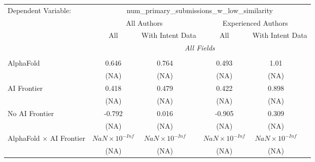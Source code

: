 \begingroup
\centering
\begin{tabular}{lcccccc}
   \tabularnewline \midrule \midrule
   Dependent Variable: & \multicolumn{6}{c}{num\_primary\_submissions\_w\_low\_similarity}\\
 & \multicolumn{3}{c}{All Authors} & \multicolumn{3}{c}{Experienced Authors} \\
\cmidrule(lr){2-4} \cmidrule(lr){5-7}
 & \multicolumn{1}{c}{All} & \multicolumn{2}{c}{With Intent Data} & \multicolumn{1}{c}{All} & \multicolumn{2}{c}{With Intent Data} \\
\cmidrule(lr){2-2} \cmidrule(lr){3-4} \cmidrule(lr){5-5} \cmidrule(lr){6-7}
 & \multicolumn{6}{c}{\textit{All Fields}} \\ \\
   AlphaFold                                                                  & 0.646                  & 0.764                  &                        & 0.493                  & 1.01                   &   \\   
                                                                              & (NA)                   & (NA)                   &                        & (NA)                   & (NA)                   &   \\   
   AI Frontier                                                                & 0.418                  & 0.479                  &                        & 0.422                  & 0.898                  &   \\   
                                                                              & (NA)                   & (NA)                   &                        & (NA)                   & (NA)                   &   \\   
   No AI Frontier                                                             & -0.792                 & 0.016                  &                        & -0.905                 & 0.309                  &   \\   
                                                                              & (NA)                   & (NA)                   &                        & (NA)                   & (NA)                   &   \\   
   AlphaFold $\times$ AI Frontier                                             & $NaN\times 10^{-Inf}$  & $NaN\times 10^{-Inf}$  &                        & $NaN\times 10^{-Inf}$  & $NaN\times 10^{-Inf}$  &   \\   
                                                                              & (NA)                   & (NA)                   &                        & (NA)                   & (NA)                   &   \\   

\end{tabular}
